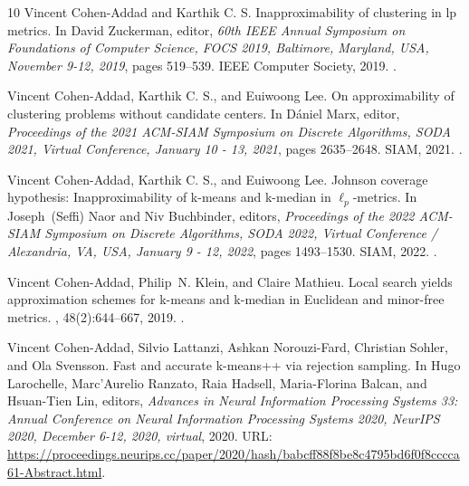 \begin{thebibliography}{10}
Vincent Cohen{-}Addad and {Karthik {C. S.}}
\newblock Inapproximability of clustering in lp metrics.
\newblock In David Zuckerman, editor, {\em 60th {IEEE} Annual Symposium on
  Foundations of Computer Science, {FOCS} 2019, Baltimore, Maryland, USA,
  November 9-12, 2019}, pages 519--539. {IEEE} Computer Society, 2019.
\newblock \href {https://doi.org/10.1109/FOCS.2019.00040}
  {}.

Vincent Cohen{-}Addad, {Karthik {C. S.}}, and Euiwoong Lee.
\newblock On approximability of clustering problems without candidate centers.
\newblock In D{\'{a}}niel Marx, editor, {\em Proceedings of the 2021 {ACM-SIAM}
  Symposium on Discrete Algorithms, {SODA} 2021, Virtual Conference, January 10
  - 13, 2021}, pages 2635--2648. {SIAM}, 2021.
\newblock \href {https://doi.org/10.1137/1.9781611976465.156}
  {}.

Vincent Cohen{-}Addad, {Karthik {C. S.}}, and Euiwoong Lee.
\newblock Johnson coverage hypothesis: Inapproximability of k-means and
  k-median in $\ell_p$-metrics.
\newblock In Joseph~(Seffi) Naor and Niv Buchbinder, editors, {\em Proceedings
  of the 2022 {ACM-SIAM} Symposium on Discrete Algorithms, {SODA} 2022, Virtual
  Conference / Alexandria, VA, USA, January 9 - 12, 2022}, pages 1493--1530.
  {SIAM}, 2022.
\newblock \href {https://doi.org/10.1137/1.9781611977073.63}
  {}.

Vincent Cohen{-}Addad, Philip~N. Klein, and Claire Mathieu.
\newblock Local search yields approximation schemes for k-means and k-median in
  {Euclidean} and minor-free metrics.
, 48(2):644--667, 2019.
\newblock \href {https://doi.org/10.1137/17M112717X}
  {}.

Vincent Cohen{-}Addad, Silvio Lattanzi, Ashkan Norouzi{-}Fard, Christian
  Sohler, and Ola Svensson.
\newblock Fast and accurate {\textdollar}k{\textdollar}-means++ via rejection
  sampling.
\newblock In Hugo Larochelle, Marc'Aurelio Ranzato, Raia Hadsell,
  Maria{-}Florina Balcan, and Hsuan{-}Tien Lin, editors, {\em Advances in
  Neural Information Processing Systems 33: Annual Conference on Neural
  Information Processing Systems 2020, NeurIPS 2020, December 6-12, 2020,
  virtual}, 2020.
\newblock URL:
  \url{https://proceedings.neurips.cc/paper/2020/hash/babcff88f8be8c4795bd6f0f8cccca61-Abstract.html}.


\end{thebibliography}
